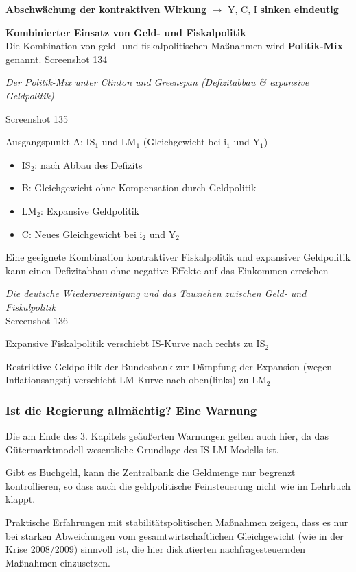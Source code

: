 \documentclass[11pt]{article}
\begin{document}
\begin{enumerate}
\textbf{Abschwächung der kontraktiven Wirkung} \(\rightarrow\) Y, C, I \textbf{sinken eindeutig}

\textbf{Kombinierter Einsatz von Geld- und Fiskalpolitik}\\
Die Kombination von geld- und fiskalpolitischen Maßnahmen wird \textbf{Politik-Mix} genannt.
Screenshot 134

\emph{Der Politik-Mix unter Clinton und Greenspan (Defizitabbau \& expansive Geldpolitik)}

Screenshot 135

Ausgangspunkt A: IS\(_{\text{1}}\) und LM\(_{\text{1}}\) (Gleichgewicht bei i\(_{\text{1}}\) und Y\(_{\text{1}}\))
\begin{itemize}
\item IS\(_{\text{2}}\): nach Abbau des Defizits
\item B: Gleichgewicht ohne Kompensation durch Geldpolitik
\item LM\(_{\text{2}}\): Expansive Geldpolitik
\item C: Neues Gleichgewicht bei i\(_{\text{2}}\) und Y\(_{\text{2}}\)
\end{itemize}

Eine geeignete Kombination kontraktiver Fiskalpolitik und expansiver Geldpolitik kann einen Defizitabbau ohne negative Effekte auf das Einkommen erreichen

\emph{Die deutsche Wiedervereinigung und das Tauziehen zwischen Geld- und Fiskalpolitik}\\

Screenshot 136

Expansive Fiskalpolitik verschiebt IS-Kurve nach rechts zu IS\(_{\text{2}}\)

Restriktive Geldpolitik der Bundesbank zur Dämpfung der Expansion (wegen Inflationsangst) verschiebt LM-Kurve nach oben(links) zu LM\(_{\text{2}}\)
\end{enumerate}

\subsubsection{Ist die Regierung allmächtig? Eine Warnung}
\label{sec:orge5f7bb5}
Die am Ende des 3. Kapitels geäußerten Warnungen gelten auch hier, da das Gütermarktmodell wesentliche Grundlage des IS-LM-Modells ist.

Gibt es Buchgeld, kann die Zentralbank die Geldmenge nur begrenzt kontrollieren, so dass auch die geldpolitische Feinsteuerung nicht wie im Lehrbuch klappt.

Praktische Erfahrungen mit stabilitätspolitischen Maßnahmen zeigen, dass es nur bei starken Abweichungen vom gesamtwirtschaftlichen Gleichgewicht (wie in der Krise 2008/2009) sinnvoll ist, die hier diskutierten nachfragesteuernden Maßnahmen einzusetzen.
\end{document}

